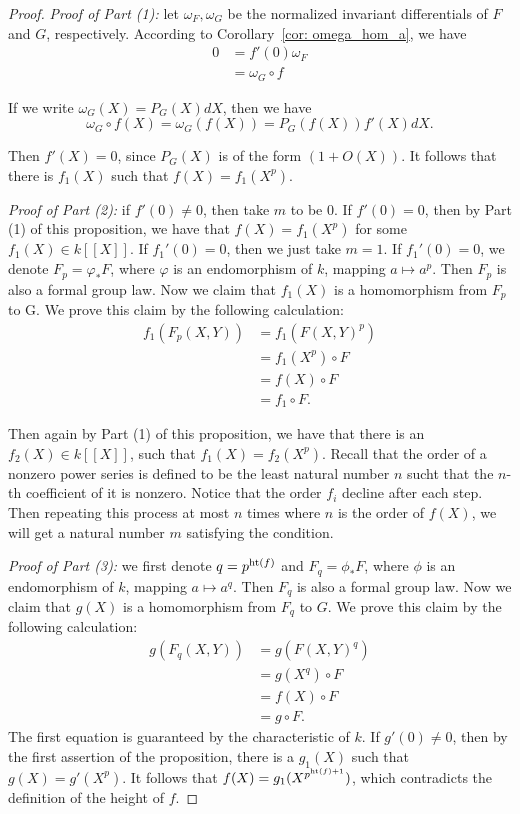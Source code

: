 \begin{proof}
    \textit{Proof of Part (1):} let $\omega_F, \omega_G$ be the normalized invariant differentials of $F$ and $G$,
    respectively. According to Corollary~\ref{cor: omega_hom_a}, we have
    \begin{align*}
        0 &= f'(0) \omega_F \\
         & = \omega_G \circ f
    \end{align*}

    If we write $\omega_G(X) = P_G(X) dX$, then we have
    \[ \omega_G \circ f(X) = \omega_G(f(X)) = P_G(f(X)) f'(X) dX. \]

    Then $f'(X) = 0$, since $P_G(X)$ is of the form $(1 + O(X))$.
    It follows that there is $f_1(X)$ such that
    $f(X) = f_1(X^p)$.

    \textit{Proof of Part (2):} if $f'(0) \neq 0$, then take $m$ to be $0$.
    If $f'(0) = 0$, then by Part (1) of this proposition, we have that
    $f(X) = f_1(X ^ p)$ for some $f_1(X) \in k[\![X]\!]$. If $f_1'(0) = 0$, then
    we just take $m = 1$. If $f_1'(0) = 0$, we denote $F_p = \varphi_* F$,
    where $\varphi$ is an endomorphism of $k$,
    mapping $a \mapsto a ^ p$. Then $F_p$ is also a formal group law. Now we
    claim that $f_1(X)$ is a homomorphism from $F_p$ to G. We prove this claim
    by the following calculation:
    \begin{align*}
        f_1(F_p(X,Y)) & = f_1 (F(X,Y) ^ p)\\
        & = f_1 (X ^ p) \circ F \\
        & = f(X) \circ F \\
        & = f_1 \circ F.
    \end{align*}

    Then again by Part (1) of this proposition, we have that there is an $f_2(X) \in k[\![X]\!]$,
    such that $f_1(X) = f_2(X^p)$. Recall that the order of a nonzero power series
    is defined to be the least natural number $n$ sucht that the $n$-th coefficient
    of it is nonzero. Notice that the order $f_i$ decline after each step.
    Then repeating this process at most $n$ times where $n$ is the order
    of $f(X)$, we will get a natural number $m$ satisfying the condition.


    \textit{Proof of Part (3):} we first denote $q = p ^ {\mathrm{ht}(f)}$
    and $F_q = \phi_* F$, where $\phi$ is an endomorphism of $k$,
    mapping $a \mapsto a ^ {q}$. Then $F_q$ is also a formal group law. Now we claim that
    $g(X)$ is a homomorphism from $F_q$ to $G$. We prove this claim by the following calculation:
    \begin{align*}
        g(F_q(X,Y)) & = g (F(X,Y) ^ q)\\
        & = g (X ^ q) \circ F \\
        & = f(X) \circ F \\
        & = g \circ F.
    \end{align*}
    The first equation is guaranteed by the characteristic of $k$.
    If $g'(0) \neq 0$, then by the first assertion of the proposition, there is a
    $g_1(X)$ such that $g(X) = g'(X ^ p)$. It follows that $f(X) = g_1(X^{p^{\mathrm{ht}(f) + 1}})$, which
    contradicts the definition of the height of $f$.
\end{proof}
